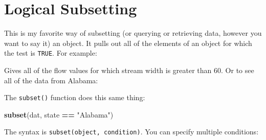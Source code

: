 \documentclass[]{book}
\newenvironment{Shaded}{\begin{snugshade}}{\end{snugshade}}
\newcommand{\KeywordTok}[1]{\textcolor[rgb]{0.13,0.29,0.53}{\textbf{#1}}}
\newcommand{\DecValTok}[1]{\textcolor[rgb]{0.00,0.00,0.81}{#1}}
\newcommand{\StringTok}[1]{\textcolor[rgb]{0.31,0.60,0.02}{#1}}
\newcommand{\OperatorTok}[1]{\textcolor[rgb]{0.81,0.36,0.00}{\textbf{#1}}}
\newcommand{\NormalTok}[1]{#1}
\theoremstyle{definition}
\theoremstyle{definition}
\theoremstyle{definition}
\theoremstyle{remark}
\begin{document}
\chapter{Logical Subsetting}\label{logical-subsetting}

This is my favorite way of subsetting (or querying or retrieving data,
however you want to say it) an object. It pulls out all of the elements
of an object for which the test is \texttt{TRUE}. For example:

\begin{Shaded}
\end{Shaded}

Gives all of the flow values for which stream width is greater than 60.
Or to see all of the data from Alabama:

\begin{Shaded}
\end{Shaded}

The \texttt{subset()} function does this same thing:

\begin{Shaded}
\begin{Highlighting}[]
\KeywordTok{subset}\NormalTok{(dat, state }\OperatorTok{==}\StringTok{ "Alabama"}\NormalTok{)}
\end{Highlighting}
\end{Shaded}

The syntax is \texttt{subset(object,\ condition)}. You can specify
multiple conditions:

\begin{Shaded}
\end{Shaded}
\end{document}
